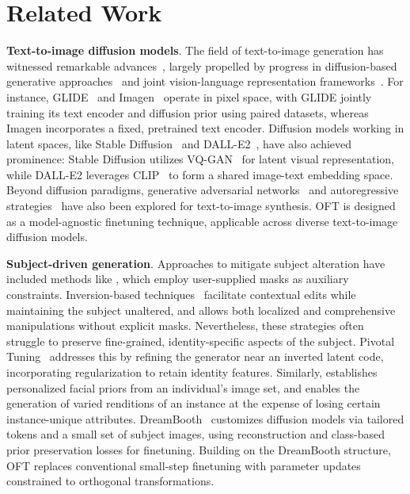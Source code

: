 \section{Related Work}

\textbf{Text-to-image diffusion models}. The field of text-to-image generation has witnessed remarkable advances~\cite{saharia2022photorealistic,ramesh2022hierarchical,rombach2022high,gu2022vector,nichol2022glide}, largely propelled by progress in diffusion-based generative approaches~\cite{ho2020denoising,song2021score,song2021denoising,dhariwal2021diffusion} and joint vision-language representation frameworks~\cite{su2020vlbert,lu2019vilbert,radford2021learning,wang2021simvlm,li2022blip,li2023blip,alayrac2022flamingo,schuhmann2022laion}. For instance, GLIDE~\cite{nichol2022glide} and Imagen~\cite{saharia2022photorealistic} operate in pixel space, with GLIDE jointly training its text encoder and diffusion prior using paired datasets, whereas Imagen incorporates a fixed, pretrained text encoder. Diffusion models working in latent spaces, like Stable Diffusion~\cite{rombach2022high} and DALL-E2~\cite{ramesh2022hierarchical}, have also achieved prominence: Stable Diffusion utilizes VQ-GAN~\cite{esser2021taming} for latent visual representation, while DALL-E2 leverages CLIP~\cite{radford2021learning} to form a shared image-text embedding space. Beyond diffusion paradigms, generative adversarial networks~\cite{reed2016generative,zhang2017stackgan,xu2018attngan,li2019controllable} and autoregressive strategies~\cite{ramesh2021zero,ding2021cogview,wu2022nuwa,yuscaling} have also been explored for text-to-image synthesis. OFT is designed as a model-agnostic finetuning technique, applicable across diverse text-to-image diffusion models.

\textbf{Subject-driven generation}. Approaches to mitigate subject alteration have included methods like \cite{avrahami2022blended,nichol2022glide}, which employ user-supplied masks as auxiliary constraints. Inversion-based techniques~\cite{choi2021ilvr,dhariwal2021diffusion,ramesh2022hierarchical,gal2022image} facilitate contextual edits while maintaining the subject unaltered, and \cite{hertz2022prompt} allows both localized and comprehensive manipulations without explicit masks. Nevertheless, these strategies often struggle to preserve fine-grained, identity-specific aspects of the subject. Pivotal Tuning~\cite{roich2022pivotal} addresses this by refining the generator near an inverted latent code, incorporating regularization to retain identity features. Similarly, \cite{nitzan2022mystyle} establishes personalized facial priors from an individual's image set, and \cite{casanova2021instance} enables the generation of varied renditions of an instance at the expense of losing certain instance-unique attributes. DreamBooth~\cite{ruiz2023dreambooth} customizes diffusion models via tailored tokens and a small set of subject images, using reconstruction and class-based prior preservation losses for finetuning. Building on the DreamBooth structure, OFT replaces conventional small-step finetuning with parameter updates constrained to orthogonal transformations.

